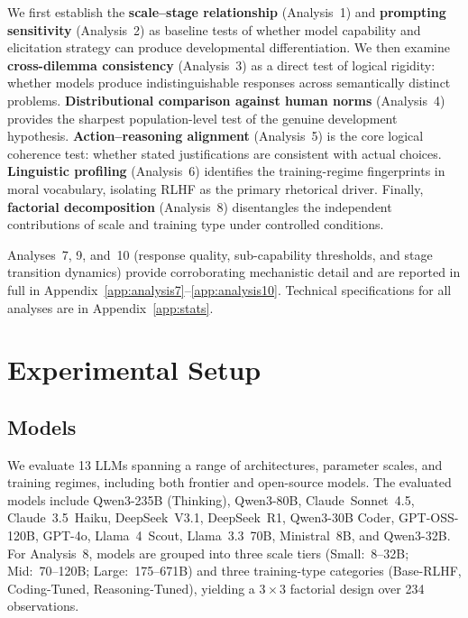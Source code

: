 \documentclass{article}
\begin{document}
We first establish the \textbf{scale--stage relationship} (Analysis~1) and \textbf{prompting sensitivity} (Analysis~2) as baseline tests of whether model capability and elicitation strategy can produce developmental differentiation. We then examine \textbf{cross-dilemma consistency} (Analysis~3) as a direct test of logical rigidity: whether models produce indistinguishable responses across semantically distinct problems. \textbf{Distributional comparison against human norms} (Analysis~4) provides the sharpest population-level test of the genuine development hypothesis. \textbf{Action--reasoning alignment} (Analysis~5) is the core logical coherence test: whether stated justifications are consistent with actual choices. \textbf{Linguistic profiling} (Analysis~6) identifies the training-regime fingerprints in moral vocabulary, isolating RLHF as the primary rhetorical driver. Finally, \textbf{factorial decomposition} (Analysis~8) disentangles the independent contributions of scale and training type under controlled conditions.

Analyses~7, 9, and~10 (response quality, sub-capability thresholds, and stage transition dynamics) provide corroborating mechanistic detail and are reported in full in Appendix~\ref{app:analysis7}--\ref{app:analysis10}. Technical specifications for all analyses are in Appendix~\ref{app:stats}.


\section{Experimental Setup}

\subsection{Models}

We evaluate 13 LLMs spanning a range of architectures, parameter scales, and training regimes, including both frontier and open-source models. The evaluated models include Qwen3-235B (Thinking), Qwen3-80B, Claude~Sonnet~4.5, Claude~3.5~Haiku, DeepSeek~V3.1, DeepSeek~R1, Qwen3-30B Coder, GPT-OSS-120B, GPT-4o, Llama~4~Scout, Llama~3.3~70B, Ministral~8B, and Qwen3-32B. For Analysis~8, models are grouped into three scale tiers (Small:~8--32B; Mid:~70--120B; Large:~175--671B) and three training-type categories (Base-RLHF, Coding-Tuned, Reasoning-Tuned), yielding a $3\times3$ factorial design over 234 observations.
\end{document}
